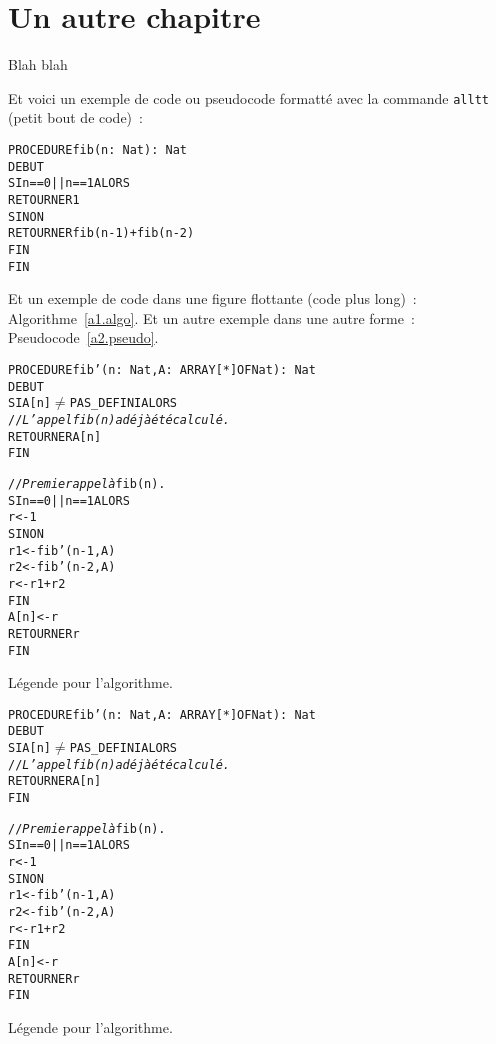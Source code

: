 
\chapter{Un autre chapitre}
\label{un-autre-chap.chap}

Blah blah

Et voici un exemple de code ou pseudocode formatté avec la commande
{\tt alltt} (petit bout de code)~:
{\small
\begin{alltt}
  PROCEDURE fib( n:\ Nat ):\ Nat
  DEBUT
    SI n == 0 || n == 1 ALORS
      RETOURNER 1
    SINON
      RETOURNER fib(n-1) + fib(n-2)
    FIN
  FIN
\end{alltt}
}

Et un exemple de code dans une figure flottante (code plus long)~:
Algorithme~\ref{a1.algo}. Et un autre exemple dans une autre forme~:
Pseudocode~\ref{a2.pseudo}.

\begin{algorithme}
{\samepage\small
\begin{alltt}
  PROCEDURE fib'( n:\ Nat, A:\ ARRAY[*] OF Nat ):\ Nat
  DEBUT
     SI A[n] \(\neq\) PAS\_DEFINI ALORS
       // \emph{L'appel {\tt fib(n)} a déjà été calculé.}
       RETOURNER A[n]
     FIN
     
     // \emph{Premier appel à} fib(n).
     SI n == 0 || n == 1 ALORS
       r <- 1
     SINON
       r1 <- fib'( n-1, A )  
       r2 <- fib'( n-2, A )  
       r  <- r1 + r2
     FIN
     A[n] <- r 
     RETOURNER r
  FIN
\end{alltt}
}
\caption{L\'egende pour l'algorithme.}
\label{a1.algo}
\end{algorithme}

\begin{pseudocode}
{\samepage\small
\begin{alltt}
  PROCEDURE fib'( n:\ Nat, A:\ ARRAY[*] OF Nat ):\ Nat
  DEBUT
     SI A[n] \(\neq\) PAS\_DEFINI ALORS
       // \emph{L'appel {\tt fib(n)} a déjà été calculé.}
       RETOURNER A[n]
     FIN
     
     // \emph{Premier appel à} fib(n).
     SI n == 0 || n == 1 ALORS
       r <- 1
     SINON
       r1 <- fib'( n-1, A )  
       r2 <- fib'( n-2, A )  
       r  <- r1 + r2
     FIN
     A[n] <- r 
     RETOURNER r
  FIN
\end{alltt}
}
\caption{L\'egende pour l'algorithme.}
\label{a2.pseudo}
\end{pseudocode}

%
\nocite{Lalonde06url}
